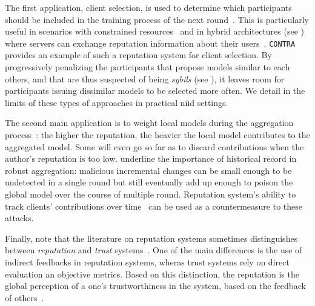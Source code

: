 The first application, client selection, is used to determine which participants should be included in the training process of the next round~\cite{kang_ReliableFederatedLearning_2020,awan_CONTRADefendingPoisoning_2021,song_ReputationBasedFederatedLearning_2022,tan_ReputationAwareFederatedLearning_2022}.
This is particularly useful in scenarios with constrained resources~\cite{song_ReputationBasedFederatedLearning_2022} and in hybrid architectures (see ) where servers can exchange reputation information about their users~\cite{kang_ReliableFederatedLearning_2020}.
\texttt{CONTRA}~\cite{awan_CONTRADefendingPoisoning_2021} provides an example of such a reputation system for client selection.
By progressively penalizing the participants that propose models similar to each others, and that are thus suspected of being \emph{sybils} (see ), it leaves room for participants issuing dissimilar models to be selected more often. 
We detail in  the limits of these types of approaches in practical \gls{niid} settings.  

The second main application is to weight local models during the aggregation process~\cite{wang_FLAREDefendingFederated_2022,wang_ReputationenabledFederatedLearning_2021}: the higher the reputation, the heavier the local model contributes to the aggregated model.
Some will even go so far as to discard contributions when the author's reputation is too low.
\textcite{karimireddy_LearningHistoryByzantine_2021} underline the importance of historical record in robust aggregation: malicious incremental changes can be small enough to be undetected in a single round but still eventually add up enough to poison the global model over the course of multiple round.
Reputation system's ability to track clients' contributions over time~\cite{kang_ReliableFederatedLearning_2020,wang_ReputationenabledFederatedLearning_2021} can be used as a countermeasure to these attacks.

Finally, note that the literature on reputation systems sometimes distinguishes between \emph{reputation} and \emph{trust} systems~\cite{chen_TRMIoTtrustmanagement_2011,zohrafilali_GlobalTrustTrust_2015}.
One of the main differences is the use of indirect feedbacks in reputation systems, wheras trust systems rely on direct evaluation an objective metrics.
Based on this distinction, the reputation is the global perception of a one's trustworthiness in the system, based on the feedback of others~\cite{chen_TRMIoTtrustmanagement_2011}.

